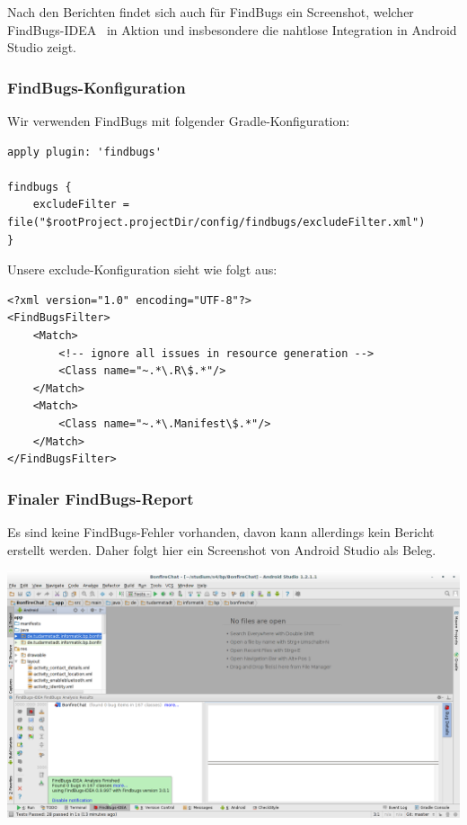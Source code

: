 Nach den Berichten findet sich auch für FindBugs ein Screenshot, welcher \glqq FindBugs-IDEA\grqq~ in Aktion und insbesondere die nahtlose Integration in Android Studio zeigt.

\subsubsection{FindBugs-Konfiguration}

Wir verwenden FindBugs mit folgender Gradle-Konfiguration:

\begin{lstlisting}
apply plugin: 'findbugs'

findbugs {
    excludeFilter = file("$rootProject.projectDir/config/findbugs/excludeFilter.xml")
}
\end{lstlisting}

Unsere exclude-Konfiguration sieht wie folgt aus:

\begin{lstlisting}
<?xml version="1.0" encoding="UTF-8"?>
<FindBugsFilter>
    <Match>
        <!-- ignore all issues in resource generation -->
        <Class name="~.*\.R\$.*"/>
    </Match>
    <Match>
        <Class name="~.*\.Manifest\$.*"/>
    </Match>
</FindBugsFilter>
\end{lstlisting}




\subsubsection{Finaler FindBugs-Report}

Es sind keine FindBugs-Fehler vorhanden, davon kann allerdings kein Bericht erstellt werden. Daher folgt hier ein Screenshot von Android Studio als Beleg.

\includegraphics[width=17.5cm]{belege/findbugs/findbugs-no-warnings-screenshot.png}

